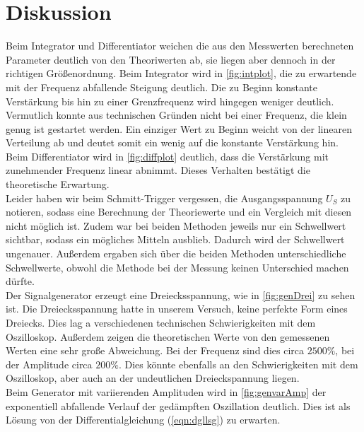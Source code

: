 \section{Diskussion}
\label{sec:Diskussion}


Beim Integrator und Differentiator weichen die aus den Messwerten berechneten Parameter deutlich von den Theoriwerten ab, sie liegen aber dennoch 
in der richtigen Größenordnung. Beim Integrator wird in \autoref{fig:intplot}, die zu erwartende mit der Frequenz abfallende Steigung deutlich. 
Die zu Beginn konstante Verstärkung bis hin zu einer Grenzfrequenz wird hingegen weniger deutlich. Vermutlich konnte aus technischen Gründen nicht 
bei einer Frequenz, die klein genug ist gestartet werden. Ein einziger Wert zu Beginn weicht von der linearen Verteilung ab und deutet somit ein 
wenig auf die konstante Verstärkung hin. Beim Differentiator wird in \autoref{fig:diffplot} deutlich, dass die Verstärkung mit zunehmender Frequenz linear 
abnimmt. Dieses Verhalten bestätigt die theoretische Erwartung.
\\
Leider haben wir beim Schmitt-Trigger vergessen, die Ausgangsspannung $U_S$ zu notieren, sodass eine Berechnung der Theoriewerte und ein Vergleich mit 
diesen nicht möglich ist. Zudem war bei beiden Methoden jeweils nur ein Schwellwert sichtbar, sodass ein mögliches Mitteln ausblieb. Dadurch wird 
der Schwellwert ungenauer. Außerdem ergaben sich über die beiden Methoden unterschiedliche Schwellwerte, obwohl die Methode bei der Messung 
keinen Unterschied machen dürfte.
\\
Der Signalgenerator erzeugt eine Dreiecksspannung, wie in \autoref{fig:genDrei} zu sehen ist. Die Dreiecksspannung hatte in unserem Versuch, 
keine perfekte Form eines Dreiecks. Dies lag a verschiedenen technischen Schwierigkeiten mit dem Oszilloskop. Außerdem zeigen die theoretischen Werte 
von den gemessenen Werten eine sehr große Abweichung. Bei der Frequenz sind dies circa $2500\%$, bei der Amplitude circa $200\%$. Dies könnte ebenfalls 
an den Schwierigkeiten mit dem Oszilloskop, aber auch an der undeutlichen Dreieckspannung liegen.
\\
Beim Generator mit variierenden Amplituden wird in \autoref{fig:genvarAmp} der exponentiell abfallende Verlauf der gedämpften Oszillation 
deutlich. Dies ist als Lösung von der Differentialgleichung (\autoref{eqn:dgllsg}) zu erwarten.